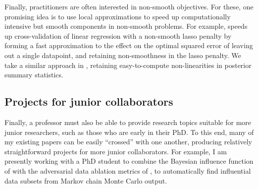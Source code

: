 Finally, practitioners are often interested in non-smooth objectives. For these,
one promising idea is to use local approximations to speed up computationally
intensive but smooth components in non-smooth problems. For example,
\citet{wilson:2020:approximatecv} speeds up cross-validation of linear
regression with a non-smooth lasso penalty by forming a fast approximation to
the effect on the optimal squared error of leaving out a single datapoint, and
retaining non-smoothness in the lasso penalty. We take a similar approach in
\citet{giordano:2021:bnpsensitivity}, retaining easy-to-compute non-linearities
in posterior summary statistics.


\subsection{Projects for junior collaborators}

Finally, a professor must also be able to provide research topics suitable for
more junior researchers, such as those who are early in their PhD.  To this end,
many of my existing papers can be easily ``crossed'' with one another, producing
relatively straightforward projects for more junior collaborators. For example,
I am presently working with a PhD student to combine the Bayesian influence
function of \citet{giordano:2021:bayesij} with the adversarial data ablation
metrics of \citet{giordano:2020:amip}, to automatically find influential data
subsets from Markov chain Monte Carlo output.


\newpage





